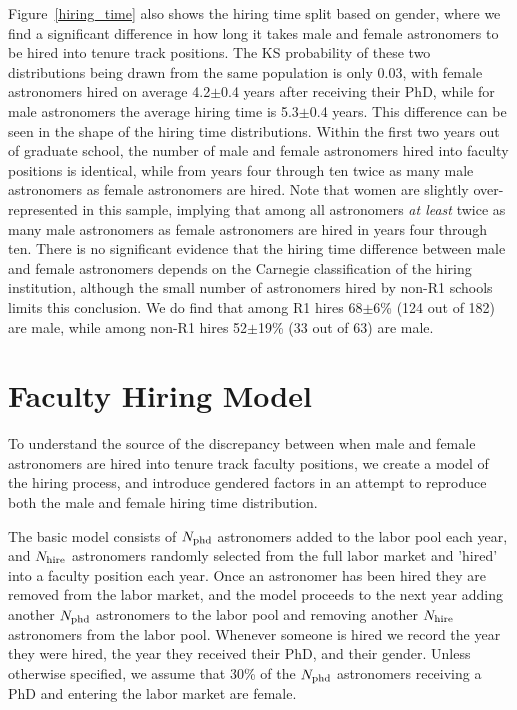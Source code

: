 \documentclass[modern]{aastex62}
\begin{document}
Figure~\ref{hiring_time} also shows the hiring time split based on gender, where we find a significant difference in how long it takes male and female astronomers to be hired into tenure track positions. The KS probability of these two distributions being drawn from the same population is only 0.03, with female astronomers hired on average 4.2$\pm$0.4 years after receiving their PhD, while for male astronomers the average hiring time is 5.3$\pm$0.4 years. This difference can be seen in the shape of the hiring time distributions. Within the first two years out of graduate school, the number of male and female astronomers hired into faculty positions is identical, while from years four through ten twice as many male astronomers as female astronomers are hired. Note that women are slightly over-represented in this sample, implying that among all astronomers {\it at least} twice as many male astronomers as female astronomers are hired in years four through ten. There is no significant evidence that the hiring time difference between male and female astronomers depends on the Carnegie classification of the hiring institution, although the small number of astronomers hired by non-R1 schools limits this conclusion. We do find that among R1 hires 68$\pm$6\% (124 out of 182) are male, while among non-R1 hires 52$\pm$19\% (33 out of 63) are male.




\section{Faculty Hiring Model\label{model}}
To understand the source of the discrepancy between when male and female astronomers are hired into tenure track faculty positions, we create a model of the hiring process, and introduce gendered factors in an attempt to reproduce both the male and female hiring time distribution.

The basic model consists of $N_{\rm phd}$ astronomers added to the labor pool each year, and $N_{\rm hire}$ astronomers randomly selected from the full labor market and 'hired' into a faculty position each year. Once an astronomer has been hired they are removed from the labor market, and the model proceeds to the next year adding another $N_{\rm phd}$ astronomers to the labor pool and removing another $N_{\rm hire}$ astronomers from the labor pool. Whenever someone is hired we record the year they were hired, the year they received their PhD, and their gender. Unless otherwise specified, we assume that 30\% of the $N_{\rm phd}$ astronomers receiving a PhD and entering the labor market are female. 
\end{document}
